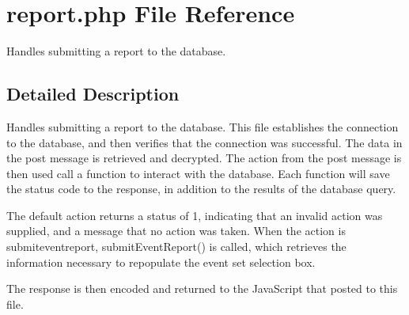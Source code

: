 \hypertarget{report_8php}{\section{report.\-php \-File \-Reference}
\label{report_8php}
}


\-Handles submitting a report to the database.  




\subsection{\-Detailed \-Description}
\-Handles submitting a report to the database. \-This file establishes the connection to the database, and then verifies that the connection was successful. \-The data in the post message is retrieved and decrypted. \-The action from the post message is then used call a function to interact with the database. \-Each function will save the status code to the response, in addition to the results of the database query.

\-The default action returns a status of 1, indicating that an invalid action was supplied, and a message that no action was taken. \-When the action is submiteventreport, submit\-Event\-Report() is called, which retrieves the information necessary to repopulate the event set selection box.

\-The response is then encoded and returned to the \-Java\-Script that posted to this file. 